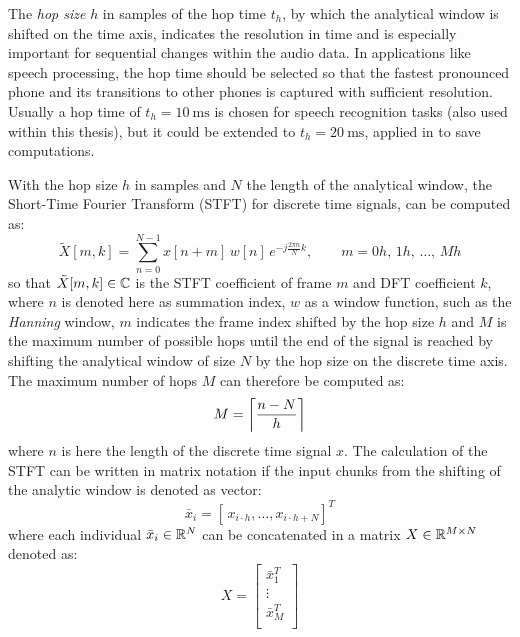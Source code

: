 The \emph{hop size} $h$ in samples of the hop time $t_h$, by which the analytical window is shifted on the time axis, indicates the resolution in time and is especially important for sequential changes within the audio data.
In applications like speech processing, the hop time should be selected so that the fastest pronounced phone and its transitions to other phones is captured with sufficient resolution.
Usually a hop time of $t_{h}=\SI{10}{\milli\second}$ is chosen for speech recognition tasks (also used within this thesis), but it could be extended to $t_{h}=\SI{20}{\milli\second}$, applied in \cite{Peter2020} to save computations.

With the hop size $h$ in samples and $N$ the length of the analytical window, the Short-Time Fourier Transform (STFT) for discrete time signals, can be computed as:
\begin{equation}\label{eq:signal_spec_stft}
    \tilde{X}[m, k] = \sum_{n=0}^{N-1} x[n + m] \, w[n] \, e^{-j\frac{2 \pi n}{N}k}, \qquad m = 0 h, \, 1 h, \, \dots, \, M h 
\end{equation}
so that $\tilde{X}[m, k] \in \C$ is the STFT coefficient of frame $m$ and DFT coefficient $k$, where $n$ is denoted here as summation index, $w$ as a window function, such as the \emph{Hanning} window, $m$ indicates the frame index shifted by the hop size $h$ and $M$ is the maximum number of possible hops until the end of the signal is reached by shifting the analytical window of size $N$ by the hop size on the discrete time axis.
The maximum number of hops $M$ can therefore be computed as:
\begin{equation}\label{eq:signal_spec_hop}
  M = \ceil*{\frac{n-N}{h}}
\end{equation}
where $n$ is here the length of the discrete time signal $x$.
The calculation of the STFT can be written in matrix notation if the input chunks from the shifting of the analytic window is denoted as vector:
\begin{equation}
  \bar{x}_i = [\, x_{i \cdot h}, \dots, x_{i \cdot h+N}]^T
\end{equation}
where each individual $\bar{x}_i \in \R^N$ can be concatenated in a matrix $X \in \R^{M \times N}$ denoted as:
\begin{equation}
  X = 
  \begin{bmatrix}
    \bar{x}_1^T \\
    \vdots\\
    \bar{x}_M^T \\
  \end{bmatrix}
\end{equation}
